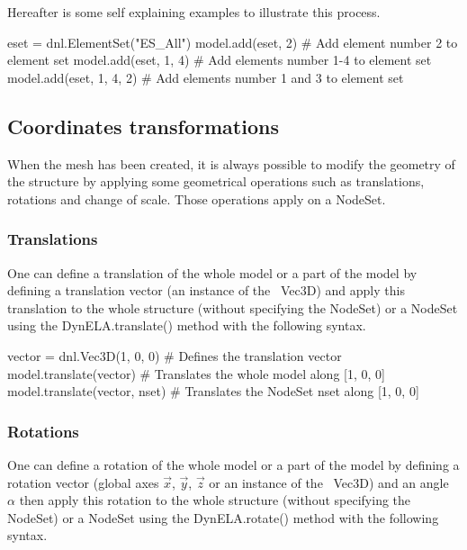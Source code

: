 Hereafter is some self explaining examples to illustrate this process.

\begin{PythonListing}
eset = dnl.ElementSet("ES_All")
model.add(eset, 2)       # Add element number 2 to element set
model.add(eset, 1, 4)    # Add elements number 1-4 to element set
model.add(eset, 1, 4, 2) # Add elements number 1 and 3 to element set
\end{PythonListing}

\subsection{Coordinates transformations}

When the mesh has been created, it is always possible to modify the geometry of the structure by applying some geometrical operations such as translations, rotations and change of scale. Those operations apply on a \textsf{NodeSet}.

\subsubsection{Translations}

One can define a translation of the whole model or a part of the model by defining a translation vector (an instance of the \DynELA~\textsf{Vec3D}) and apply this translation to the whole structure (without specifying the \textsf{NodeSet}) or a \textsf{NodeSet} using the \textsf{DynELA.translate()} method with the following syntax.

\begin{PythonListing}
vector = dnl.Vec3D(1, 0, 0)   # Defines the translation vector
model.translate(vector)       # Translates the whole model along [1, 0, 0]
model.translate(vector, nset) # Translates the NodeSet nset along [1, 0, 0]
\end{PythonListing}

\subsubsection{Rotations}

One can define a rotation of the whole model or a part of the model by defining a rotation vector (global axes $\overrightarrow{\ensuremath{x}}$, $\overrightarrow{y}$, $\overrightarrow{\ensuremath{z}}$ or an instance of the \DynELA~\textsf{Vec3D}) and an angle $\alpha$ then apply this rotation to the whole structure (without specifying the \textsf{NodeSet}) or a \textsf{NodeSet} using the \textsf{DynELA.rotate()} method with the following syntax.


